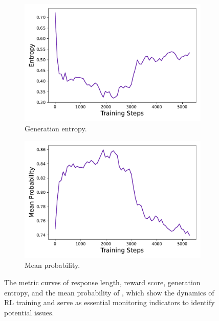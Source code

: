 \begin{figure}[t]
\begin{subfigure}{0.45\textwidth}
        \includegraphics[width=\textwidth]{figures/entropy.pdf}
        \caption{Generation entropy.}
        \label{subfig:entropy}
    \end{subfigure}
    \hfill
    \begin{subfigure}{0.45\textwidth}
        \centering
        \includegraphics[width=\textwidth]{figures/prob.pdf}
        \caption{Mean probability.}
        \label{subfig:prob}
    \end{subfigure}
    \caption{The metric curves of response length, reward score, generation entropy, and the mean probability of \method, which show the dynamics of RL training and serve as essential monitoring indicators to identify potential issues.}
    \label{fig:metrics}
\end{figure}

